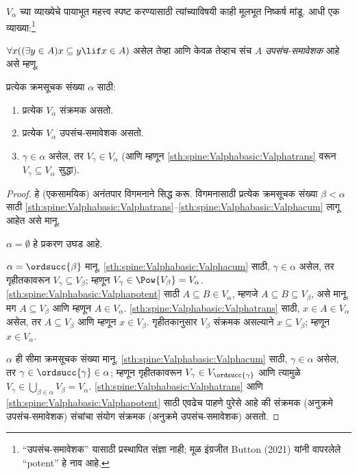 $V_\alpha$ च्या व्याख्येचे पायाभूत महत्त्व स्पष्ट करण्यासाठी त्यांच्याविषयी काही मूलभूत निष्कर्ष मांडू. आधी एक व्याख्या:\footnote{``उपसंच-समावेशक'' यासाठी प्रस्थापित संज्ञा नाही; मूळ इंग्रजीत Button (2021) यांनी वापरलेले ``potent'' हे नाव आहे.}
\begin{defn}
	$\forall x((\exists y \in A)x \subseteq y \lif x \in A)$ असेल तेव्हा आणि केवळ तेव्हाच संच $A$ \emph{उपसंच-समावेशक} आहे असे म्हणू.
\end{defn}
\begin{lem}\label{sth:spine:Valphabasic:Valphabasicprops}
प्रत्येक क्रमसूचक संख्या $\alpha$ साठी:
\begin{enumerate}
	\item\label{sth:spine:Valphabasic:Valphatrans} प्रत्येक $V_\alpha$ संक्रमक असतो.
	\item\label{sth:spine:Valphabasic:Valphapotent} प्रत्येक $V_\alpha$ उपसंच-समावेशक असतो.
	\item\label{sth:spine:Valphabasic:Valphacum} $\gamma \in \alpha$ असेल, तर $V_\gamma
	\in V_\alpha$ (आणि म्हणून \ref{sth:spine:Valphabasic:Valphatrans} वरून $V_\gamma \subseteq V_\alpha$ सुद्धा).
\end{enumerate}
\end{lem}

\begin{proof}
हे (एकसामयिक) अनंतपार विगमनाने सिद्ध करू. विगमनासाठी प्रत्येक क्रमसूचक संख्या $\beta < \alpha$ साठी \ref{sth:spine:Valphabasic:Valphatrans}--\ref{sth:spine:Valphabasic:Valphacum} लागू आहेत असे मानू.

$\alpha = \emptyset$ हे प्रकरण उघड आहे.

$\alpha = \ordsucc{\beta}$ मानू. \ref{sth:spine:Valphabasic:Valphacum} साठी, $\gamma \in \alpha$ असेल, तर गृहीतकावरून $V_\gamma \subseteq V_\beta$; म्हणून $V_\gamma \in \Pow{V_\beta} = V_\alpha$. \ref{sth:spine:Valphabasic:Valphapotent} साठी $A \subseteq B \in V_\alpha$, म्हणजे $A
\subseteq B \subseteq V_\beta$, असे मानू. मग $A \subseteq V_\beta$ आणि म्हणून $A \in V_\alpha$. \ref{sth:spine:Valphabasic:Valphatrans} साठी, $x \in A \in
V_\alpha$ असेल, तर $A \subseteq V_\beta$ आणि म्हणून $x \in V_\beta$. गृहीतकानुसार $V_\beta$ संक्रमक असल्याने $x \subseteq V_\beta$; म्हणून $x \in V_\alpha$.

$\alpha$ ही सीमा क्रमसूचक संख्या मानू. \ref{sth:spine:Valphabasic:Valphacum} साठी, $\gamma \in \alpha$ असेल, तर $\gamma \in \ordsucc{\gamma} \in \alpha$; म्हणून गृहीतकावरून $V_\gamma \in V_{\ordsucc{\gamma}}$ आणि त्यामुळे $V_\gamma \in \bigcup_{\beta \in \alpha} V_\beta = V_\alpha$. \ref{sth:spine:Valphabasic:Valphatrans} आणि \ref{sth:spine:Valphabasic:Valphapotent} साठी एवढेच पाहणे पुरेसे आहे की संक्रमक (अनुक्रमे उपसंच-समावेशक) संचांचा संयोग संक्रमक (अनुक्रमे उपसंच-समावेशक) असतो.
\end{proof}

